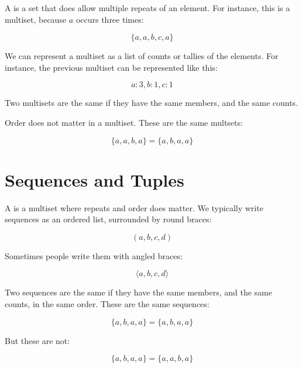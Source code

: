 \documentclass[../../../main.tex]{subfiles}
\begin{document}
A  is a set that does allow multiple repeats of an element. For instance, this is a multiset, because $a$ occurs three times:

\begin{equation*}
\{ a, a, b, c, a \}
\end{equation*}

\noindent
We can represent a multiset as a list of counts or tallies of the elements. For instance, the previous multiset can be represented like this:

\begin{equation*}
a: 3, b: 1, c: 1
\end{equation*}

\noindent
Two multisets are the same if they have the same members, and the same counts. 

Order does not matter in a multiset. These are the same multsets:

\begin{equation*}
\{ a, a, b, a \} = \{ a, b, a, a \}
\end{equation*}


\section{Sequences and Tuples}

A  is a multiset where repeats and order does matter. We typically write sequences as an ordered list, surrounded by round braces:

\begin{equation*}
( a, b, c, d )
\end{equation*}

\noindent
Sometimes people write them with angled braces:

\begin{equation*}
\langle a, b, c, d \rangle
\end{equation*}

\noindent
Two sequences are the same if they have the same members, and the same counts, in the same order. These are the same sequences:

\begin{equation*}
\{ a, b, a, a \} = \{ a, b, a, a \}
\end{equation*}

\noindent
But these are not:

\begin{equation*}
\{ a, b, a, a \} = \{ a, a, b, a \}
\end{equation*}
\end{document}
